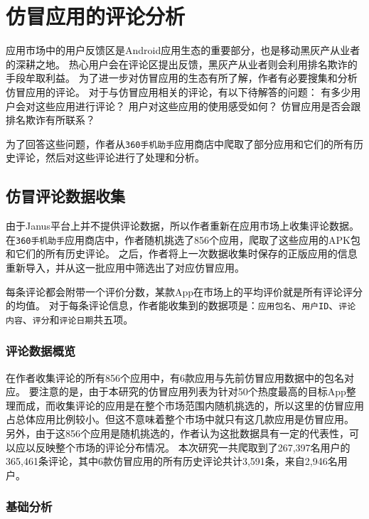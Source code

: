 \chapter{仿冒应用的评论分析}
\label{chp:feedback}

应用市场中的用户反馈区是Android应用生态的重要部分，也是移动黑灰产从业者的深耕之地。
热心用户会在评论区提出反馈，黑灰产从业者则会利用排名欺诈的手段牟取利益。
为了进一步对仿冒应用的生态有所了解，作者有必要搜集和分析仿冒应用的评论。
对于与仿冒应用相关的评论，有以下待解答的问题：
有多少用户会对这些应用进行评论？
用户对这些应用的使用感受如何？
仿冒应用是否会跟排名欺诈有所联系？

为了回答这些问题，作者从\texttt{360手机助手}应用商店中爬取了部分应用和它们的所有历史评论，然后对这些评论进行了处理和分析。

\section{仿冒评论数据收集}
由于Janus平台上并不提供评论数据，所以作者重新在应用市场上收集评论数据。
在\texttt{360手机助手}应用商店中，作者随机挑选了856个应用，爬取了这些应用的APK包和它们的所有历史评论。
之后，作者将上一次数据收集时保存的正版应用的信息重新导入\mytool，并从这一批应用中筛选出了对应仿冒应用。

每条评论都会附带一个评价分数，某款App在市场上的平均评价就是所有评论评分的均值。
对于每条评论信息，作者能收集到的数据项是：\texttt{应用包名}、\texttt{用户ID}、\texttt{评论内容}、\texttt{评分}和\texttt{评论日期}共五项。

\subsection{评论数据概览}
在作者收集评论的所有856个应用中，有6款应用与先前仿冒应用数据中的包名对应。
要注意的是，由于本研究的仿冒应用列表为针对50个热度最高的目标App整理而成，而收集评论的应用是在整个市场范围内随机挑选的，所以这里的仿冒应用占总体应用比例较小。但这不意味着整个市场中就只有这几款应用是仿冒应用。
另外，由于这856个应用是随机挑选的，作者认为这批数据具有一定的代表性，可以应以反映整个市场的评论分布情况。
本次研究一共爬取到了267,397名用户的365,461条评论，其中6款仿冒应用的所有历史评论共计3,591条，来自2,946名用户。

\subsection{基础分析}

